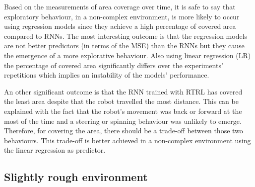 \documentclass[msc,ai,logo]{infthesis}
\begin{document}
Based on the measurements of area coverage over time, it is safe to say that exploratory behaviour, in a non-complex environment, is more likely to occur using regression models since they achieve a high percentage of covered area compared to RNNs. The most interesting outcome is that the regression models are not better predictors (in terms of the MSE) than the RNNs but they cause the emergence of a more explorative behaviour. Also using linear regression (LR) the percentage of covered area significantly differs over the experiments' repetitions which implies an instability of the models' performance. 

An other significant outcome is that the RNN trained with RTRL has covered the least area despite that the robot travelled the most distance. This can be explained with the fact that the robot's movement was back or forward at the most of the time and a steering or spinning behaviour was unlikely to emerge. Therefore, for covering the area, there should be a trade-off between those two behaviours. This trade-off is better achieved in a non-complex environment using the linear regression as predictor.          


\subsection{Slightly rough environment}
\end{document}
